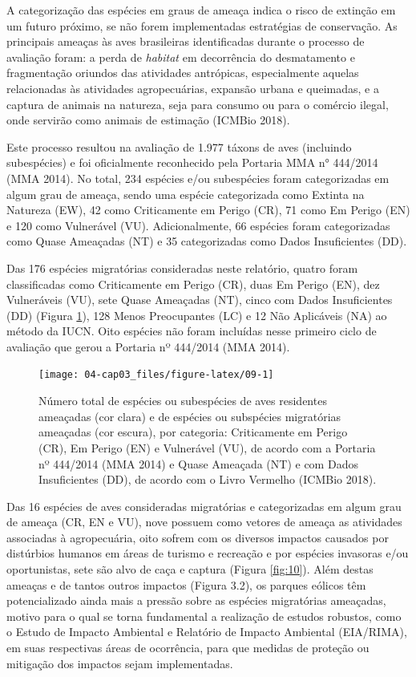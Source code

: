 \documentclass[
  oneside]{scrbook}
\begin{document}
A categorização das espécies em graus de ameaça indica o risco de extinção em um futuro próximo, se não forem implementadas estratégias de conservação. As principais ameaças às aves brasileiras identificadas durante o processo de avaliação foram: a perda de \emph{habitat} em decorrência do desmatamento e fragmentação oriundos das atividades antrópicas, especialmente aquelas relacionadas às atividades agropecuárias, expansão urbana e queimadas, e a captura de animais na natureza, seja para consumo ou para o comércio ilegal, onde servirão como animais de estimação (ICMBio 2018).

Este processo resultou na avaliação de 1.977 táxons de aves (incluindo subespécies) e foi oficialmente reconhecido pela Portaria MMA n° 444/2014 (MMA 2014). No total, 234 espécies e/ou subespécies foram categorizadas em algum grau de ameaça, sendo uma espécie categorizada como Extinta na Natureza (EW), 42 como Criticamente em Perigo (CR), 71 como Em Perigo (EN) e 120 como Vulnerável (VU). Adicionalmente, 66 espécies foram categorizadas como Quase Ameaçadas (NT) e 35 categorizadas como Dados Insuficientes (DD).

Das 176 espécies migratórias consideradas neste relatório, quatro foram classificadas como Criticamente em Perigo (CR), duas Em Perigo (EN), dez Vulneráveis (VU), sete Quase Ameaçadas (NT), cinco com Dados Insuficientes (DD) (Figura \ref{fig:09}), 128 Menos Preocupantes (LC) e 12 Não Aplicáveis (NA) ao método da IUCN. Oito espécies não foram incluídas nesse primeiro ciclo de avaliação que gerou a Portaria nº 444/2014 (MMA 2014).

\begin{figure}[H]

{\centering \texttt{[image: 04-cap03\_files/figure-latex/09-1]} 

}

\caption{Número total de espécies ou subespécies de aves residentes ameaçadas (cor clara) e de espécies ou subspécies migratórias ameaçadas (cor escura), por categoria: Criticamente em Perigo (CR), Em Perigo (EN) e Vulnerável (VU), de acordo com a Portaria nº 444/2014 (MMA 2014) e Quase Ameaçada (NT) e com Dados Insuficientes (DD), de acordo com o Livro Vermelho (ICMBio 2018).}\label{fig:09}
\end{figure}

Das 16 espécies de aves consideradas migratórias e categorizadas em algum grau de ameaça (CR, EN e VU), nove possuem como vetores de ameaça as atividades associadas à agropecuária, oito sofrem com os diversos impactos causados por distúrbios humanos em áreas de turismo e recreação e por espécies invasoras e/ou oportunistas, sete são alvo de caça e captura (Figura \ref{fig:10}). Além destas ameaças e de tantos outros impactos (Figura 3.2), os parques eólicos têm potencializado ainda mais a pressão sobre as espécies migratórias ameaçadas, motivo para o qual se torna fundamental a realização de estudos robustos, como o Estudo de Impacto Ambiental e Relatório de Impacto Ambiental (EIA/RIMA), em suas respectivas áreas de ocorrência, para que medidas de proteção ou mitigação dos impactos sejam implementadas.
\end{document}
